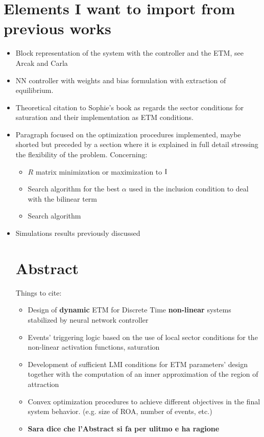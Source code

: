 \documentclass{article}
\begin{document}
\section{Elements I want to import from previous works}
\begin{itemize}
  \item Block representation of the system with the controller and the ETM, see Arcak and Carla
  \item NN controller with weights and bias formulation with extraction of equilibrium.
  \item Theoretical citation to Sophie's book as regards the sector conditions for saturation and their implementation as ETM conditions.
  \item Paragraph focused on the optimization procedures implemented, maybe shorted but preceded by a section where it is explained in full detail stressing the flexibility of the problem. Concerning: \begin{itemize}
    \item $R$ matrix minimization or maximization to $\operatorname{I}$
    \item Search algorithm for the best $\alpha$ used in the inclusion condition to deal with the bilinear term
    \item Search algorithm 
  \end{itemize} 
  \item Simulations results previously discussed

\section{\textbf{Abstract}}
Things to cite:
\begin{itemize}
  \item Design of \textbf{dynamic} ETM for Discrete Time \textbf{non-linear} systems stabilized by neural network controller
  \item Events' triggering logic based on the use of local sector conditions for the non-linear activation functions, saturation
  \item Development of sufficient LMI conditions for ETM parameters' design together with the computation of an inner approximation of the region of attraction
  \item Convex optimization procedures to achieve different objectives in the final system behavior. (e.g. size of ROA, number of events, etc.)
  \item \textbf{Sara dice che l'Abstract si fa per ulitmo e ha ragione}
\end{itemize}


\end{itemize}
\end{document}
